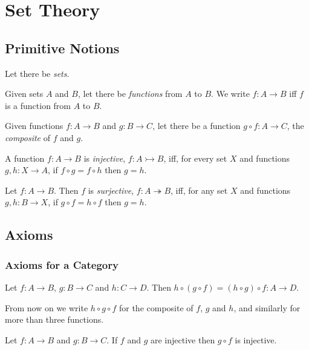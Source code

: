 \chapter{Set Theory}

\section{Primitive Notions}

Let there be \emph{sets}.

Given sets $A$ and $B$, let there be \emph{functions} from $A$ to $B$. We
write $f : A \rightarrow B$ iff $f$ is a function from $A$ to $B$.

Given functions $f : A \rightarrow B$ and $g : B \rightarrow C$, let there be
a function $g \circ f : A \rightarrow C$, the \emph{composite} of $f$ and $g$.

\begin{df}[Injective]
  A function $f : A \rightarrow B$ is \emph{injective}, $f : A
  \rightarrowtail B$, iff, for every set $X$ and functions $g, h : X
  \rightarrow
  A$, if $f \circ g = f \circ h$ then $g = h$.
\end{df}

\begin{df}[Surjective]
  Let $f : A \rightarrow B$. Then $f$ is \emph{surjective}, $f : A
\twoheadrightarrow B$, iff, for any set
  $X$ and functions $g, h : B \rightarrow X$, if $g \circ f = h \circ f$ then
  $g
  = h$.
\end{df}

\section{Axioms}

\subsection{Axioms for a Category}

\begin{ax}[Associativity]
  Let $f : A \rightarrow B$, $g : B \rightarrow C$ and $h : C \rightarrow D$.
  Then $h \circ (g \circ f) = (h \circ g) \circ f : A \rightarrow D$.
\end{ax}

From now on we write $h \circ g \circ f$ for the composite of $f$, $g$ and
$h$, and similarly for more than three functions.

\begin{lm}
 Let $f : A \rightarrow B$ and $g : B \rightarrow C$. If $f$ and $g$ are
injective then $g \circ f$ is injective.
\end{lm}

